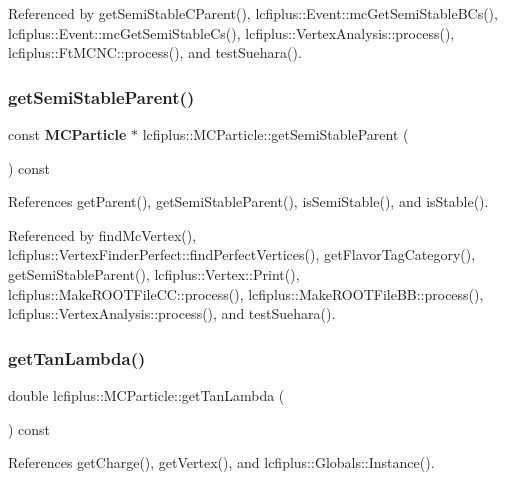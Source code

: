 Referenced by get\+Semi\+Stable\+C\+Parent(), lcfiplus\+::\+Event\+::mc\+Get\+Semi\+Stable\+B\+Cs(), lcfiplus\+::\+Event\+::mc\+Get\+Semi\+Stable\+Cs(), lcfiplus\+::\+Vertex\+Analysis\+::process(), lcfiplus\+::\+Ft\+M\+C\+N\+C\+::process(), and test\+Suehara().

\mbox{\label{classlcfiplus_1_1MCParticle_ab29cf56695d2c1f8c71b5c3aaf50fd0d}} 
\subsubsection{get\+Semi\+Stable\+Parent()}
{\footnotesize\ttfamily const \textbf{ M\+C\+Particle} $\ast$ lcfiplus\+::\+M\+C\+Particle\+::get\+Semi\+Stable\+Parent (\begin{DoxyParamCaption}{ }\end{DoxyParamCaption}) const}



References get\+Parent(), get\+Semi\+Stable\+Parent(), is\+Semi\+Stable(), and is\+Stable().



Referenced by find\+Mc\+Vertex(), lcfiplus\+::\+Vertex\+Finder\+Perfect\+::find\+Perfect\+Vertices(), get\+Flavor\+Tag\+Category(), get\+Semi\+Stable\+Parent(), lcfiplus\+::\+Vertex\+::\+Print(), lcfiplus\+::\+Make\+R\+O\+O\+T\+File\+C\+C\+::process(), lcfiplus\+::\+Make\+R\+O\+O\+T\+File\+B\+B\+::process(), lcfiplus\+::\+Vertex\+Analysis\+::process(), and test\+Suehara().

\mbox{\label{classlcfiplus_1_1MCParticle_a0b346f6bc705597099bf51f76d5951dc}} 
\subsubsection{get\+Tan\+Lambda()}
{\footnotesize\ttfamily double lcfiplus\+::\+M\+C\+Particle\+::get\+Tan\+Lambda (\begin{DoxyParamCaption}{ }\end{DoxyParamCaption}) const}



References get\+Charge(), get\+Vertex(), and lcfiplus\+::\+Globals\+::\+Instance().



